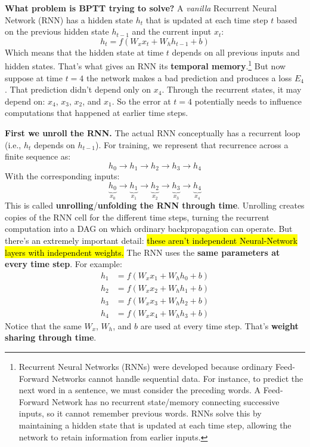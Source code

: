 \highspace
\textcolor{Green3}{ \textbf{What problem is BPTT trying to solve?}} A \emph{vanilla} Recurrent Neural Network (RNN) has a hidden state $h_t$ that is updated at each time step $t$ based on the previous hidden state $h_{t-1}$ and the current input $x_t$:
\begin{equation*}
    h_t = f\left(
        W_{x}x_t + W_{h}h_{t-1} + b
    \right)
\end{equation*}
Which means that the hidden state at time $t$ depends on all previous inputs and hidden states. That's what gives an RNN its \textbf{temporal memory}.\footnote{
    Recurrent Neural Networks (RNNs) were developed because ordinary Feed-Forward Networks cannot handle sequential data. For instance, to predict the next word in a sentence, we must consider the preceding words. A Feed-Forward Network has no recurrent state/memory connecting successive inputs, so it cannot remember previous words. RNNs solve this by maintaining a hidden state that is updated at each time step, allowing the network to retain information from earlier inputs.
} But now suppose at time $t = 4$ the network makes a bad prediction and produces a loss $E_{4}$. That prediction didn't depend only on $x_4$. Through the recurrent states, it may depend on: $x_4$, $x_3$, $x_2$, and $x_1$. So the error at $t = 4$ potentially needs to influence computations that happened at earlier time steps.

\highspace
\textcolor{Green3}{ \textbf{First we unroll the RNN.}} The actual RNN conceptually has a recurrent loop (i.e., $h_t$ depends on $h_{t-1}$). For training, we represent that recurrence across a finite sequence as:
\begin{equation*}
    h_0 \to h_1 \to h_2 \to h_3 \to h_4
\end{equation*}
With the corresponding inputs:
\begin{equation*}
    \underbrace{h_0}_{x_0} \to \underbrace{h_1}_{x_1} \to \underbrace{h_2}_{x_2} \to \underbrace{h_3}_{x_3} \to \underbrace{h_4}_{x_4}
\end{equation*}
This is called \textbf{unrolling}/\textbf{unfolding the RNN through time}. Unrolling creates copies of the RNN cell for the different time steps, turning the recurrent computation into a DAG on which ordinary backpropagation can operate. But there's an extremely important detail: \hl{these aren't independent Neural-Network layers with independent weights.} The RNN uses the \textbf{same parameters at every time step}. For example:
\begin{align*}
    h_1 &= f\left(
        W_{x}x_1 + W_{h}h_{0} + b
    \right) \\
    h_2 &= f\left(
        W_{x}x_2 + W_{h}h_{1} + b
    \right) \\
    h_3 &= f\left(
        W_{x}x_3 + W_{h}h_{2} + b
    \right) \\
    h_4 &= f\left(
        W_{x}x_4 + W_{h}h_{3} + b
    \right)
\end{align*}
Notice that the same $W_x$, $W_h$, and $b$ are used at every time step. That's \textbf{weight sharing through time}.

